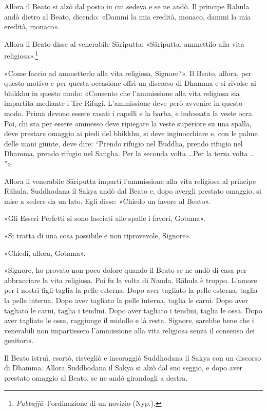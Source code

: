 Allora il Beato si alzò dal posto in cui sedeva e se ne andò. Il
principe Rāhula andò dietro al Beato, dicendo: «Dammi la mia eredità,
monaco, dammi la mia eredità, monaco».


Allora il Beato disse al venerabile Sāriputta: «Sāriputta, ammettilo
alla vita religiosa».\footnote{\emph{Pabbajjā}: l’ordinazione di un novizio (Nyp.).}


«Come faccio ad ammetterlo alla vita religiosa, Signore?». Il Beato,
allora, per questo motivo e per questa occasione offrì un discorso di
Dhamma e si rivolse ai bhikkhu in questo modo: «Consento che
l’ammissione alla vita religiosa sia impartita mediante i Tre Rifugi.
L’ammissione deve però avvenire in questo modo. Prima devono essere
rasati i capelli e la barba, e indossata la veste ocra. Poi, chi sta per
essere ammesso deve ripiegare la veste superiore su una spalla, deve
prestare omaggio ai piedi del bhikkhu, si deve inginocchiare e, con le
palme delle mani giunte, deve dire: “Prendo rifugio nel Buddha, prendo
rifugio nel Dhamma, prendo rifugio nel Saṅgha. Per la seconda volta …​
Per la terza volta …​”».


Allora il venerabile Sāriputta impartì l’ammissione alla vita religiosa
al principe Rāhula. Suddhodana il Sakya andò dal Beato e, dopo avergli
prestato omaggio, si mise a sedere da un lato. Egli disse: «Chiedo un
favore al Beato».


«Gli Esseri Perfetti si sono lasciati alle spalle i favori, Gotama».


«Si tratta di una cosa possibile e non riprovevole, Signore».


«Chiedi, allora, Gotama».


«Signore, ho provato non poco dolore quando il Beato se ne andò di casa
per abbracciare la vita religiosa. Poi fu la volta di Nanda. Rāhula è
troppo. L’amore per i nostri figli taglia la pelle esterna. Dopo aver
tagliato la pelle esterna, taglia la pelle interna. Dopo aver tagliato
la pelle interna, taglia le carni. Dopo aver tagliato le carni, taglia i
tendini. Dopo aver tagliato i tendini, taglia le ossa. Dopo aver
tagliato le ossa, raggiunge il midollo e là resta. Signore, sarebbe bene
che i venerabili non impartissero l’ammissione alla vita religiosa senza
il consenso dei genitori».


Il Beato istruì, esortò, risvegliò e incoraggiò Suddhodana il Sakya con
un discorso di Dhamma. Allora Suddhodana il Sakya si alzò dal suo
seggio, e dopo aver prestato omaggio al Beato, se ne andò girandogli a
destra.


